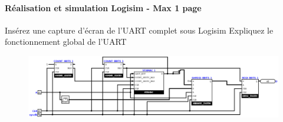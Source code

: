 \documentclass[a4paper]{article} %
\begin{document}
\begin{tcolorbox}[colframe=Monokaimagenta,colback=white]
\paragraph{Réalisation et simulation Logisim - Max 1 page}
Insérez une capture d’écran de l’UART complet sous Logisim
Expliquez le fonctionnement global de l’UART\\

\begin{figure}[H]
\centering
    \includegraphics[width=1\textwidth]{src/UART.png}
    \label{fig:countBase}
\end{figure}


\end{tcolorbox}
\end{document}
